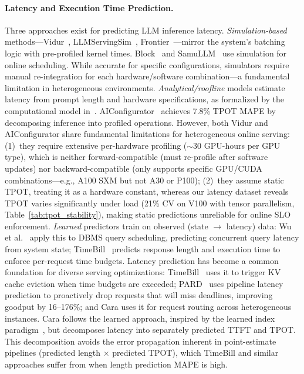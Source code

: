 \documentclass[letterpaper, anonymous, twocolumn, 10pt]{article}
\begin{document}
\paragraph{Latency and Execution Time Prediction.}
Three approaches exist for predicting LLM inference latency.
\emph{Simulation-based} methods---Vidur~\cite{Agrawal2024VidurAL}, LLMServingSim~\cite{kim2024llmservingsimhwswcosimulation}, Frontier~\cite{tan2025frontiersimulatingnext}---mirror the system's batching logic with pre-profiled kernel times.
Block~\cite{da2025blockbalancingloadllm} and SamuLLM~\cite{SamuLLM} use simulation for online scheduling.
While accurate for specific configurations, simulators require manual re-integration for each hardware/software combination---a fundamental limitation in heterogeneous environments.
\emph{Analytical/roofline} models estimate latency from prompt length and hardware specifications, as formalized by the computational model in~\cite{klpm2025}.
AIConfigurator~\cite{aiconfigurator2025} achieves 7.8\% TPOT MAPE by decomposing inference into profiled operations.
However, both Vidur and AIConfigurator share fundamental limitations for heterogeneous online serving:
(1)~they require extensive per-hardware profiling ($\sim$30 GPU-hours per GPU type), which is neither forward-compatible (must re-profile after software updates) nor backward-compatible (only supports specific GPU/CUDA combinations---e.g., A100 SXM but not A30 or P100);
(2)~they assume static TPOT, treating it as a hardware constant, whereas our latency dataset reveals TPOT varies significantly under load (21\% CV on V100 with tensor parallelism, Table~\ref{tab:tpot_stability}), making static predictions unreliable for online SLO enforcement.
\emph{Learned} predictors train on observed (state $\rightarrow$ latency) data: Wu et al.~\cite{wu2025improvingdbmsschedulingdecisions} apply this to DBMS query scheduling, predicting concurrent query latency from system state; TimeBill~\cite{timebill2025} predicts response length and execution time to enforce per-request time budgets.
Latency prediction has become a common foundation for diverse serving optimizations: TimeBill~\cite{timebill2025} uses it to trigger KV cache eviction when time budgets are exceeded; PARD~\cite{pard2025} uses pipeline latency prediction to proactively drop requests that will miss deadlines, improving goodput by 16--176\%; and Cara uses it for request routing across heterogeneous instances.
Cara follows the learned approach, inspired by the learned index paradigm~\cite{kraska2018case}, but decomposes latency into separately predicted TTFT and TPOT.
This decomposition avoids the error propagation inherent in point-estimate pipelines (predicted length $\times$ predicted TPOT), which TimeBill and similar approaches suffer from when length prediction MAPE is high.
\end{document}
